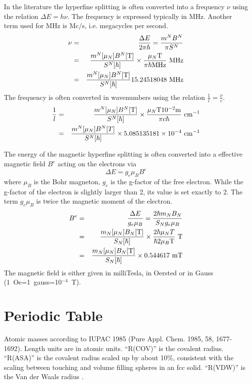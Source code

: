 \documentclass[final,12pt,makeidx,DIV=calc]{article}
\begin{document}
{{{{{{In the literature the hyperfine splitting is often converted into a
frequency $\nu$ using the relation $\Delta E=h\nu$. The frequency is
expressed typically in MHz. Another term used for MHz is Mc$/$s, i.e.
megacycles per second.
\begin{eqnarray*}
\nu&=&\frac{\Delta E}{2\pi\hbar} 
=\frac{m^N B^N}{\pi S^N}
\\
&=&
\frac{m^N[\mu_N]B^N[{\rm T}]}{S^N[\hbar]}
\times\frac{\mu_N {\rm T}}{\pi \hbar {\rm MHz}}\ {\rm MHz}
\\
&=&\frac{m^N[\mu_N]B^N[{\rm T}]}{S^N[\hbar]} 15.24518048\ {\rm MHz}
\end{eqnarray*}
The frequency is often converted in wavenumbers using the relation
$\frac{1}{l}=\frac{\nu}{c}$.
\begin{eqnarray*}
\frac{1}{l}&=&
\frac{m^N[\mu_N]B^N[{\rm T}]}{S^N[\hbar]} \times\frac{\mu_N {\rm T}
  10^{-2}{\rm m}}{\pi c\hbar
  }\ {\rm cm}^{-1}
\\
&=&
\frac{m^N[\mu_N]B^N[T]}{S^N[\hbar]} \times 5.085135181\times 10^{-4}\ {\rm cm}^{-1}
\end{eqnarray*}


The energy of the magnetic hyperfine splitting is often converted into
a effective magnetic field $B^e$ acting on the electrons via
\begin{displaymath}
\Delta E=g_e\mu_B B^e
\end{displaymath}
where $\mu_B$ is the Bohr magneton, $g_e$ is the g-factor of the free
electron. While the g-factor of the electron is slightly larger than
2, its value is set exactly to 2. The term $g_e\mu_B$ is twice the
magnetic moment of the electron. 
\begin{eqnarray*}
B^e&=&\frac{\Delta E}{g_e\mu_B}=\frac{2\hbar m_N B_N}{S_N g_e\mu_B}
\\
&=&\frac{m_N[\mu_N]B_N[{\rm T}]}{S_N[\hbar]}\times 
\frac{2\hbar\mu_N T}{\hbar 2\mu_B {\rm T}}\ {\rm T} 
\\
&=& \frac{m_N[\mu_N]B_N[{\rm T}]}{S_N[\hbar]}\times 0.544617\ {\rm mT}
\end{eqnarray*}
The magnetic field is either given in
milliTesla, in Oersted or in Gauss (1~Oe=1~gauss=10$^{-4}$~T).

\newpage
\section{Periodic Table}
Atomic masses according to IUPAC 1985 (Pure Appl. Chem. 1985, 58,
1677-1692). Length units are in atomic units. ``R(COV)'' is the covalent radius.
``R(ASA)'' is the covalent radius scaled up by about 10\%, consistent
with the scaling between touching and volume filling spheres in an fcc
solid. ``R(VDW)'' is the Van der Waals radius \cite{rappe92_jacs114_10024}.

}}}}}}
\end{document}
